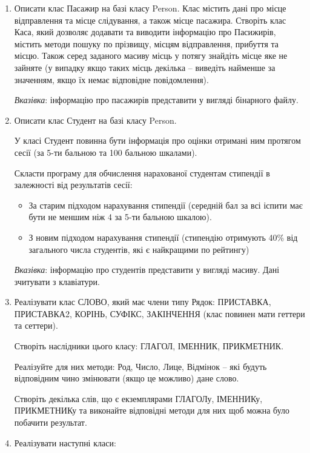 \documentclass[]{article}
\begin{document}
\begin{enumerate}
\def\labelenumi{\arabic{enumi})}
\setcounter{enumi}{2}
\item
  Описати клас Пасажир на базі класу Person. Клас містить дані про місце
  відправлення та місце слідування, а також місце пасажира. Створіть
  клас Каса, який дозволяє додавати та виводити інформацію про
  Пасижирів, містить методи пошуку по прізвищу, місцям відправлення,
  прибуття та місцю. Також серед заданого масиву місць у потягу знайдіть
  місце яке не зайняте (у випадку якщо таких місць декілька -- виведіть
  найменше за значенням, якщо їх немає відповідне повідомлення).

  \emph{\emph{Вказівка}}: інформацію про пасажирів представити у вигляді
бінарного файлу.

\item
  Описати клас Студент на базі класу Person.

У класі Студент повинна бути інформація про оцінки отримані ним протягом
сесії (за 5-ти бальною та 100 бальною шкалами).

Скласти програму для обчислення нарахованої студентам стипендії в
залежності від результатів сесії:

\begin{itemize}
\item
  За старим підходом нарахування стипендії (середній бал за всі іспити
  має бути не меншим ніж 4 за 5-ти бальною шкалою).
\item
  З новим підходом нарахування стипендії (стипендію отримують 40\% від
  загального числа студентів, які є найкращими по рейтингу)
\end{itemize}

\emph{\emph{Вказівка}}: інформацію про студентів представити у вигляді
масиву. Дані зчитувати з клавіатури.

\item
  Реалізувати клас СЛОВО, який має члени типу Рядок: ПРИСТАВКА,
  ПРИСТАВКА2, КОРІНЬ, СУФІКС, ЗАКІНЧЕННЯ (клас повинен мати геттери та
  сеттери).

Створіть наслідники цього класу: ГЛАГОЛ, ІМЕННИК, ПРИКМЕТНИК.

Реалізуйте для них методи: Род, Число, Лице, Відмінок -- які будуть
відповідним чино змінювати (якщо це можливо) дане слово.

Створіть декілька слів, що є екземплярами ГЛАГОЛу, ІМЕННИКу, ПРИКМЕТНИКу
та виконайте відповідні методи для них щоб можна було побачити
результат.

\item
  Реалізувати наступні класи:


\end{enumerate}
\end{document}
